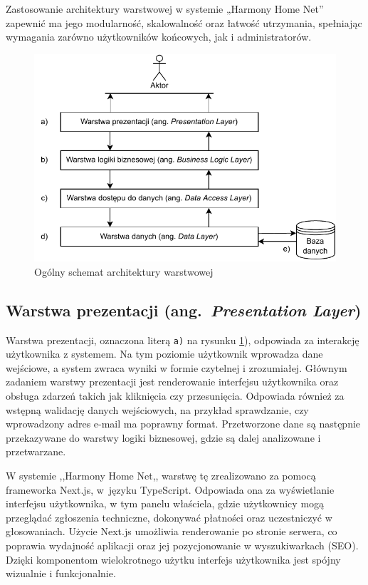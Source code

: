 Zastosowanie architektury warstwowej w systemie „Harmony Home Net” zapewnić ma jego modularność, skalowalność oraz łatwość utrzymania, spełniając wymagania zarówno użytkowników końcowych, jak i administratorów.
\begin{figure}[htb]
    \centering
    \includegraphics[scale=1.2]{rys03/diagram_architektury_warstwowej}
    \caption{Ogólny schemat architektury warstwowej}
    \label{fig:n_tier_arch}
\end{figure}

\subsection{Warstwa prezentacji (ang.\ \emph{Presentation Layer})}
Warstwa prezentacji, oznaczona literą \texttt{a)} na rysunku \ref{fig:n_tier_arch}), odpowiada za interakcję użytkownika z systemem. Na tym poziomie użytkownik wprowadza dane wejściowe, a system zwraca wyniki w formie czytelnej i zrozumiałej. Głównym zadaniem warstwy prezentacji jest renderowanie interfejsu użytkownika oraz obsługa zdarzeń takich jak kliknięcia czy przesunięcia. Odpowiada również za wstępną walidację danych wejściowych, na przykład sprawdzanie, czy wprowadzony adres e-mail ma poprawny format. Przetworzone dane są następnie przekazywane do warstwy logiki biznesowej, gdzie są dalej analizowane i przetwarzane.

W systemie ,,Harmony Home Net,, warstwę tę zrealizowano za pomocą frameworka Next.js, w~języku TypeScript. Odpowiada ona za wyświetlanie interfejsu użytkownika, w tym panelu właściela, gdzie użytkownicy mogą przeglądać zgłoszenia techniczne, dokonywać płatności oraz uczestniczyć w głosowaniach. Użycie Next.js umożliwia renderowanie po stronie serwera, co poprawia wydajność aplikacji oraz jej pozycjonowanie w wyszukiwarkach (SEO). Dzięki komponentom wielokrotnego użytku interfejs użytkownika jest spójny wizualnie i funkcjonalnie. 

